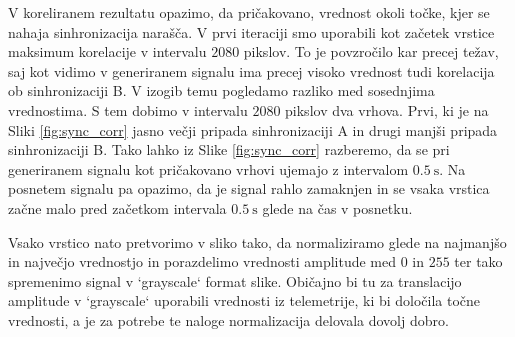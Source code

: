 \documentclass{article}
\begin{document}
V koreliranem rezultatu opazimo, da pričakovano, vrednost okoli točke, kjer se nahaja sinhronizacija narašča. V prvi iteraciji smo uporabili kot začetek vrstice maksimum korelacije v intervalu $2080$ pikslov. To je povzročilo kar precej težav, saj kot vidimo v generiranem signalu ima precej visoko vrednost tudi korelacija ob sinhronizaciji B. V izogib temu pogledamo razliko med sosednjima vrednostima. S tem dobimo v intervalu $2080$ pikslov dva vrhova. Prvi, ki je na Sliki \ref{fig:sync_corr} jasno večji pripada sinhronizaciji A in drugi manjši pripada sinhronizaciji B. Tako lahko iz Slike \ref{fig:sync_corr} razberemo, da se pri generiranem signalu kot pričakovano vrhovi ujemajo z intervalom $\SI{0.5}{\second}$. Na posnetem signalu pa opazimo, da je signal rahlo zamaknjen in se vsaka vrstica začne malo pred začetkom intervala $\SI{0.5}{\second}$ glede na čas v posnetku.

Vsako vrstico nato pretvorimo v sliko tako, da normaliziramo glede na najmanjšo in največjo vrednostjo in porazdelimo vrednosti amplitude med $0$ in $255$ ter tako spremenimo signal v `grayscale` format slike. Običajno bi tu za translacijo amplitude v `grayscale` uporabili vrednosti iz telemetrije, ki bi določila točne vrednosti, a je za potrebe te naloge normalizacija delovala dovolj dobro.
\newpage
\end{document}
